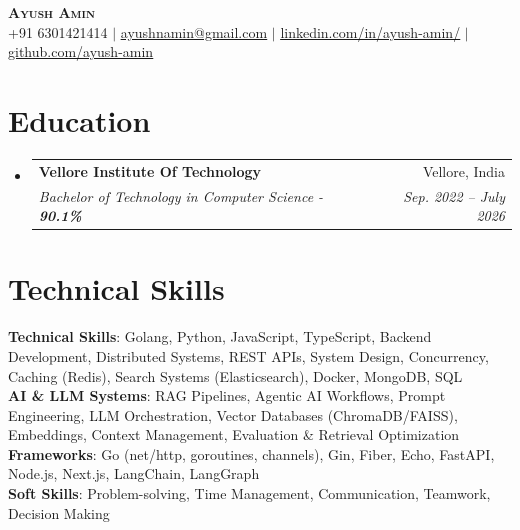 \documentclass[letterpaper,11pt]{article}
\makeatletter
\newcommand{\resumeSubheading}[4]{
  \vspace{-2pt}\item
    \begin{tabular*}{0.97\textwidth}[t]{l@{\extracolsep{\fill}}r}
      \textbf{#1} & #2 \\
      \textit{\small#3} & \textit{\small #4} \\
    \end{tabular*}\vspace{-7pt}
}
\newcommand{\resumeSubHeadingListStart}{\begin{itemize}[leftmargin=0.15in, label={}]}
\newcommand{\resumeSubHeadingListEnd}{\end{itemize}}
\makeatother
\begin{document}

\begin{center}
    \textbf{\Huge \scshape Ayush Amin} \\ \vspace{1pt}
    \small +91 6301421414 $|$ \href{mailto:ayushnamin@gmail.com}{\underline{ayushnamin@gmail.com}} $|$ 
    \href{https://www.linkedin.com/in/ayush-amin/}{\underline{linkedin.com/in/ayush-amin/}} $|$
    \href{https://github.com/ayush-amin}{\underline{github.com/ayush-amin}}
\end{center}


\section{Education}
  \resumeSubHeadingListStart
    \resumeSubheading
      {Vellore Institute Of Technology}{Vellore, India}
      {Bachelor of Technology in Computer Science - \textbf{90.1\%}}{Sep. 2022 -- July 2026}    
  \resumeSubHeadingListEnd

\section{Technical Skills}
 \begin{itemize}[leftmargin=0.15in, label={}]
    \small{\item{
     \textbf{Technical Skills}{: Golang, Python, JavaScript, TypeScript, Backend Development, Distributed Systems, REST APIs, System Design, Concurrency, Caching (Redis), Search Systems (Elasticsearch), Docker, MongoDB, SQL} \\
     
     \textbf{AI \& LLM Systems}{: RAG Pipelines, Agentic AI Workflows, Prompt Engineering, LLM Orchestration, Vector Databases (ChromaDB/FAISS), Embeddings, Context Management, Evaluation \& Retrieval Optimization} \\
     
     \textbf{Frameworks}{: Go (net/http, goroutines, channels), Gin, Fiber, Echo, FastAPI, Node.js, Next.js, LangChain, LangGraph} \\
     
     
     \textbf{Soft Skills}{: Problem-solving, Time Management, Communication, Teamwork, Decision Making}
    }}
    \end{itemize}
\end{document}
